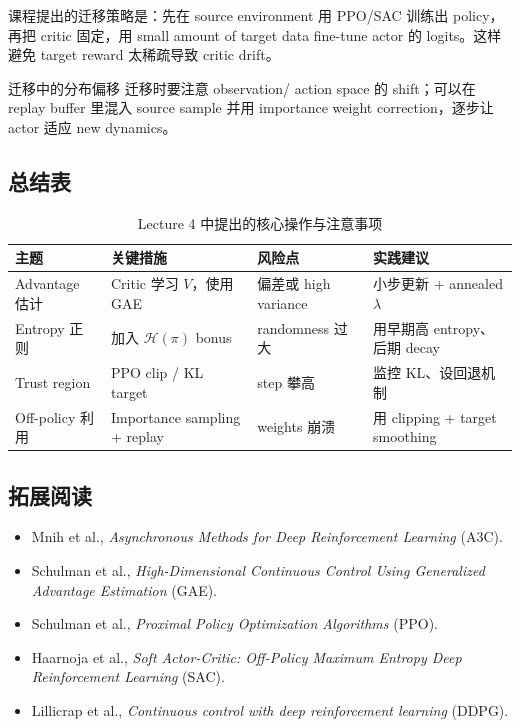 课程提出的迁移策略是：先在 source environment 用 PPO/SAC 训练出 policy，再把 critic 固定，用 small amount of target data fine-tune actor 的 logits。这样避免 target reward 太稀疏导致 critic drift。

\begin{knowledgebox}{迁移中的分布偏移}
迁移时要注意 observation/ action space 的 shift；可以在 replay buffer 里混入 source sample 并用 importance weight correction，逐步让 actor 适应 new dynamics。
\end{knowledgebox}

\subsection{总结表}

\begin{table}[H]
\centering
\begin{tabular}{p{}p{}p{}p{}}
\toprule
主题 & 关键措施 & 风险点 & 实践建议 \\
\midrule
Advantage 估计 & Critic 学习 $V$，使用 GAE & 偏差或 high variance & 小步更新 + annealed $\lambda$ \\
Entropy 正则 & 加入 $\mathcal{H}(\pi)$ bonus & randomness 过大 & 用早期高 entropy、后期 decay \\
Trust region & PPO clip / KL target & step 攀高 & 监控 KL、设回退机制 \\
Off-policy 利用 & Importance sampling + replay & weights 崩溃 & 用 clipping + target smoothing \\
\bottomrule
\end{tabular}
\caption{Lecture 4 中提出的核心操作与注意事项}
\end{table}

\subsection{拓展阅读}
\begin{itemize}
    \item Mnih et al., \textit{Asynchronous Methods for Deep Reinforcement Learning} (A3C).
    \item Schulman et al., \textit{High-Dimensional Continuous Control Using Generalized Advantage Estimation} (GAE).
    \item Schulman et al., \textit{Proximal Policy Optimization Algorithms} (PPO).
    \item Haarnoja et al., \textit{Soft Actor-Critic: Off-Policy Maximum Entropy Deep Reinforcement Learning} (SAC).
    \item Lillicrap et al., \textit{Continuous control with deep reinforcement learning} (DDPG).
\end{itemize}


